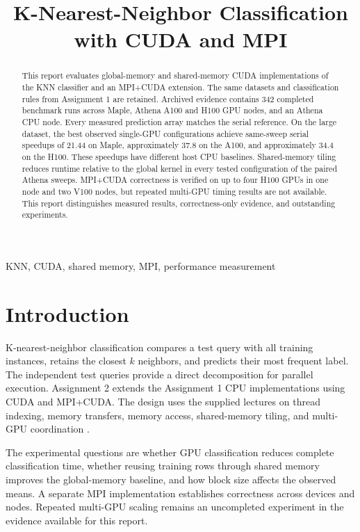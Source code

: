 \documentclass[conference]{IEEEtran}
\begin{document}
\title{K-Nearest-Neighbor Classification with CUDA and MPI}
\author{
}
\maketitle
\begin{abstract}
This report evaluates global-memory and shared-memory CUDA implementations of the KNN classifier and an MPI+CUDA extension. The same datasets and classification rules from Assignment 1 are retained. Archived evidence contains 342 completed benchmark runs across Maple, Athena A100 and H100 GPU nodes, and an Athena CPU node. Every measured prediction array matches the serial reference. On the large dataset, the best observed single-GPU configurations achieve same-sweep serial speedups of 21.44 on Maple, approximately 37.8 on the A100, and approximately 34.4 on the H100. These speedups have different host CPU baselines. Shared-memory tiling reduces runtime relative to the global kernel in every tested configuration of the paired Athena sweeps. MPI+CUDA correctness is verified on up to four H100 GPUs in one node and two V100 nodes, but repeated multi-GPU timing results are not available. This report distinguishes measured results, correctness-only evidence, and outstanding experiments.
\end{abstract}
\begin{IEEEkeywords}KNN, CUDA, shared memory, MPI, performance measurement\end{IEEEkeywords}

\section{Introduction}
K-nearest-neighbor classification compares a test query with all training instances, retains the closest $k$ neighbors, and predicts their most frequent label. The independent test queries provide a direct decomposition for parallel execution. Assignment 2 extends the Assignment 1 CPU implementations using CUDA and MPI+CUDA. The design uses the supplied lectures on thread indexing, memory transfers, memory access, shared-memory tiling, and multi-GPU coordination \cite{cuda8,cuda9,cuda10,cuda13,mpi6}.

The experimental questions are whether GPU classification reduces complete classification time, whether reusing training rows through shared memory improves the global-memory baseline, and how block size affects the observed means. A separate MPI implementation establishes correctness across devices and nodes. Repeated multi-GPU scaling remains an uncompleted experiment in the evidence available for this report.
\end{document}
